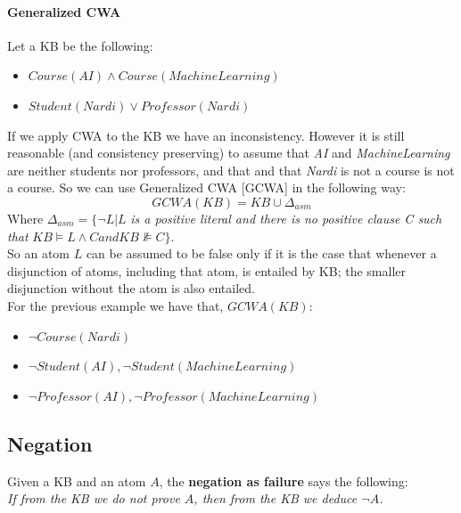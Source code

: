 \documentclass[10pt,a4paper]{article}
\begin{document}
\paragraph{Generalized CWA}
Let a KB be the following:
\begin{itemize}
\item $Course(AI) \wedge Course(MachineLearning)$
\item $Student(Nardi) \vee Professor(Nardi)$
\end{itemize}
If we apply CWA to the KB we have an inconsistency. However it is still reasonable (and consistency preserving) to assume that \textit{AI} and \textit{MachineLearning} are neither students nor professors, 
and that and that \textit{Nardi} is not a course is not a course. So we can use Generalized CWA [GCWA] in the following way:
\[GCWA(KB)=KB\cup \Delta_{asm}\]
Where $\Delta_{asm}= \lbrace \neg L | L$ \textit{is a positive literal and there is no positive clause C
such that} $KB \models L\wedge C and KB \nVDash C \rbrace$.\\
So an atom $L$ can be assumed to be false only if it is the case that whenever a disjunction of atoms, including that atom, is entailed by KB; the smaller disjunction without the atom is also entailed.\\
For the previous example we have that, $GCWA(KB)$:
\begin{itemize}
\item $\neg Course(Nardi)$
\item $\neg Student(AI), \neg Student(MachineLearning)$
\item $\neg Professor(AI), \neg Professor(MachineLearning)$
\end{itemize}

\subsection{Negation}
Given a KB and an atom $A$, the \textbf{negation as failure} says the following:\\
\textit{If from the KB we do not prove $A$, then from the KB we deduce $\neg A$.}\\
\end{document}
